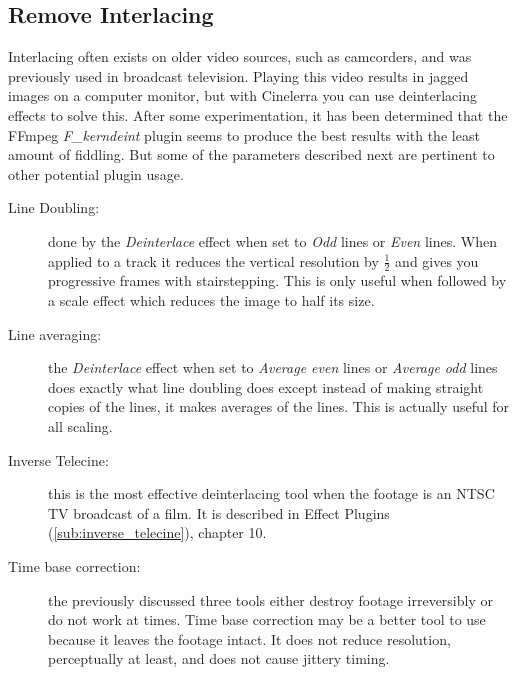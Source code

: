\subsection{Remove Interlacing}%
\label{sub:remove_interlacing}

Interlacing often exists on older video sources, such as camcorders, and was previously used in broadcast television. Playing this video results in jagged images on a computer monitor, but with Cinelerra you can use deinterlacing effects to solve this.  After some experimentation, it has been determined that the FFmpeg \textit{F\_kerndeint} plugin seems to produce the best results with the least amount of fiddling.  But some of the parameters described next are pertinent to other potential plugin usage.

\begin{description}
	\item[Line Doubling:] done by the \textit{Deinterlace} effect when set to \textit{Odd} lines or \textit{Even} lines.  When applied to a track it reduces the vertical resolution by $\frac{1}{2}$ and gives you progressive frames with stairstepping. This is only useful when followed by a scale effect which reduces the image to half its size.
	\item[Line averaging:] the \textit{Deinterlace} effect when set to \textit{Average even} lines or \textit{Average odd} lines does exactly what line doubling does except instead of making straight copies of the lines, it makes averages of the lines. This is actually useful for all scaling.
	\item[Inverse Telecine:] this is the most effective deinterlacing tool when the footage is an NTSC TV broadcast of a film. It is described in Effect Plugins (\ref{sub:inverse_telecine}), chapter 10.
	\item[Time base correction:] the previously discussed three tools either destroy footage irreversibly or do not work at times. Time base correction may be a better tool to use because it leaves the footage intact. It does not reduce resolution, perceptually at least, and does not cause jittery timing.

\end{description}

